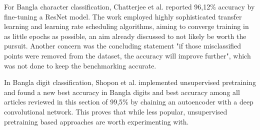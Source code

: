 \documentclass{article}
\begin{document}
For Bangla character classification, Chatterjee et al. reported 96,12\% accuracy 
by fine-tuning a ResNet model. The work employed highly sophisticated transfer
 learning and learning rate scheduling algorithms, aiming to converge training in as 
 little epochs as possible, an aim already discussed to not likely be worth the pursuit.
  Another concern was the concluding statement "if those misclassified points were 
  removed from the dataset, the accuracy will improve further", which was not done 
  to keep the benchmarking accurate.



In Bangla digit classification, Shopon et al. \cite{6shoponBangla} implemented unsupervised 
pretraining and found a new best accuracy in Bangla digits
and best accuracy among all articles reviewed in this section of 99,5\% by chaining an autoencoder
with a deep convolutional network. This proves that while less popular, unsupervised pretraining
based approaches are worth experimenting with.



\end{document}
